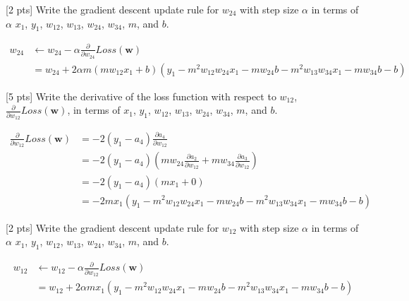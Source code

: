 \begin{question}{[2 pts]}
Write the gradient descent update rule for $w_{24}$ with step size $\alpha$ in terms of $\alpha$ $x_1$, $y_1$, $w_{12}$, $w_{13}$, $w_{24}$, $w_{34}$, $m$, and $b$.

\begin{minipage}{\textwidth}
    \solution{} {\begin{align*}
    w_{24} &\leftarrow w_{24}-\alpha\frac{\partial}{\partial w_{24}} Loss(\boldsymbol{w})\\
    &= w_{24}+2\alpha m(mw_{12}x_1+b)(y_1-m^2w_{12}w_{24}x_1-mw_{24}b-m^2w_{13}w_{34}x_1-mw_{34}b-b)
    \end{align*}
    }
\end{minipage}

\end{question}

\begin{question}{[5 pts]}
Write the derivative of the loss function with respect to $w_{12}$, $\frac{\partial}{\partial w_{12}} Loss(\boldsymbol{w})$, in terms of $x_1$, $y_1$, $w_{12}$, $w_{13}$, $w_{24}$, $w_{34}$, $m$, and $b$.

\begin{minipage}{\textwidth}
    \solution{} {\begin{align*}
    \frac{\partial}{\partial w_{12}}Loss(\boldsymbol{w}) &= -2(y_1-a_4)\frac{\partial a_4}{\partial w_{12}}\\
    &= -2(y_1-a_4)(mw_{24}\frac{\partial a_2}{\partial w_{12}}+mw_{34}\frac{\partial a_3}{\partial w_{12}})\\
    &= -2(y_1-a_4)(mx_1+0)\\
    &= -2mx_1(y_1-m^2w_{12}w_{24}x_1-mw_{24}b-m^2w_{13}w_{34}x_1-mw_{34}b-b)
    \end{align*}
    }
\end{minipage}

\end{question}

\begin{question}{[2 pts]}
Write the gradient descent update rule for $w_{12}$ with step size $\alpha$ in terms of $\alpha$ $x_1$, $y_1$, $w_{12}$, $w_{13}$, $w_{24}$, $w_{34}$, $m$, and $b$.

\begin{minipage}{\textwidth}
    \solution{} {\begin{align*}
    w_{12} &\leftarrow w_{12}-\alpha\frac{\partial}{\partial w_{12}} Loss(\boldsymbol{w})\\
    &= w_{12}+2\alpha mx_1(y_1-m^2w_{12}w_{24}x_1-mw_{24}b-m^2w_{13}w_{34}x_1-mw_{34}b-b)
    \end{align*}
    }
\end{minipage}
\end{question}

